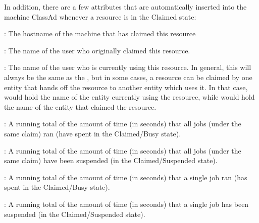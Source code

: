 In addition, there are a few attributes that are automatically
inserted into the machine ClassAd whenever a resource is in the
Claimed state:

\begin{description}

\item[\AdAttr{ClientMachine}] : The hostname of the machine that has
claimed this resource

\item[\AdAttr{RemoteOwner}] : The name of the user who originally
claimed this resource.

\item[\AdAttr{RemoteUser}] : The name of the user who is currently
using this resource.
In general, this will always be the same as the ,
but in some cases, a resource can be claimed by one entity that hands
off the resource to another entity which uses it.
In that case,  would hold the name of the entity
currently using the resource, while  would hold
the name of the entity that claimed the resource.

\item[\AdAttr{TotalClaimRunTime}] : A running total of the amount of
time (in seconds) that all jobs (under the same claim) ran
(have spent in the Claimed/Busy state).


\item[\AdAttr{TotalClaimSuspendTime}] :  A running total of the amount of
time (in seconds) that all jobs (under the same claim) have been
suspended (in the Claimed/Suspended state).

\item[\AdAttr{TotalJobRunTime}] :  A running total of the amount of
time (in seconds) that a single job ran
(has spent in the Claimed/Busy state).

\item[\AdAttr{TotalJobSuspendTime}] : A running total of the amount of
time (in seconds) that a single job has been suspended
(in the Claimed/Suspended state).

\end{description}

